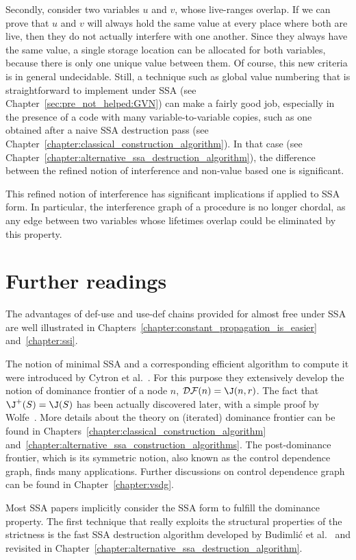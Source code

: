 Secondly, consider two variables $u$ and $v$, whose live-ranges overlap. 
If we can prove that $u$ and $v$ will always hold the same value at every place where both are live, then they do not actually interfere with one another. 
Since they always have the same value, a single storage location can be allocated for both variables, because there is only one unique value between them. 
Of course, this new criteria is in general undecidable. 
Still, a technique such as global value numbering that is straightforward to implement under SSA (see Chapter~\ref{sec:pre_not_helped:GVN}) can make a fairly good job, especially in the presence of a code with many variable-to-variable copies, such as one obtained after a naive SSA destruction pass (see Chapter~\ref{chapter:classical_construction_algorithm}). 
In that case (see Chapter~\ref{chapter:alternative_ssa_destruction_algorithm}), the difference between the refined notion of interference and non-value based one is significant.

This refined notion of interference has significant implications if applied to SSA form. 
In particular, the interference graph of a procedure is no longer chordal, as any edge between two variables whose lifetimes overlap could be eliminated by this property.


\section{Further readings}
The advantages of def-use and use-def chains provided for almost free under SSA are well illustrated in Chapters~\ref{chapter:constant_propagation_is_easier} and~\ref{chapter:ssi}.

The notion of minimal SSA and a corresponding efficient algorithm to compute it were introduced by Cytron et al.~\cite{CytronOct91}. 
For this purpose they extensively develop the notion of dominance frontier of a node $n$, ${\cal DF}(n)=\J(n,r)$. 
The fact that $\J^+(S)=\J(S)$ has been actually discovered later, with a simple proof by Wolfe~\cite{WolfeJul94}. 
More details about the theory on (iterated) dominance frontier can be found in Chapters~\ref{chapter:classical_construction_algorithm} and~\ref{chapter:alternative_ssa_construction_algorithms}. 
The post-dominance frontier, which is its symmetric notion, also known as the control dependence graph, finds many applications. 
Further discussions on control dependence graph can be found in Chapter~\ref{chapter:vsdg}.

Most SSA papers implicitly consider the SSA form to fulfill the dominance property. 
The first technique that really exploits the structural properties of the strictness is the fast SSA destruction algorithm developed by Budimli\'c et al.~\cite{BudimlicJun02} and revisited in Chapter~\ref{chapter:alternative_ssa_destruction_algorithm}.

